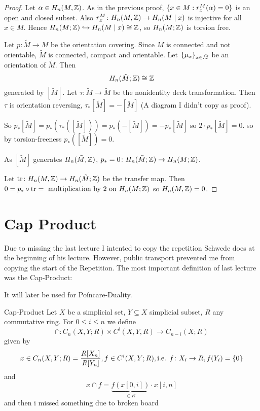 \documentclass[language=english]{TemplateLecture}
\begin{document}
\begin{proof}
    Let \(\alpha \in H_n(M, \mathbb{Z})\). As in the previous proof,
    \(\{x \in M : r_x^M(\alpha) = 0\}\) is an open and closed subset. Also \(r_x^M\colon H_n(M, \mathbb{Z}) \to H_n(M \mid x)\) is injective for all \(x \in M\). Hence \(H_n(M; \mathbb{Z}) \hookrightarrow H_n(M \mid x) \cong \mathbb{Z}\), so \(H_n(M; \mathbb{Z})\) is torsion free.

    Let \(p\colon \tilde M \to M\) be the orientation covering. Since \(M\) is connected and not orientable, \(\tilde M\) is connected, compact and orientable. Let \(\{\mu_x\}_{x \in \tilde M}\) be an orientation of \(\tilde M\). Then
    \[H_n(\tilde M; \mathbb{Z}) \cong \mathbb{Z}\]
    generated by \([\tilde M]\). Let \(\tau\colon \tilde M \to \tilde M\) be the nonidentity deck transformation. Then \(\tau\) is orientation reversing, \(\tau_*[\tilde M] = - [\tilde M]\) (A diagram I didn't copy as proof).

    So \(p_*[\tilde M] = p_*(\tau_*([\tilde M])) = p_*(- [\tilde M]) = - p_* [\tilde M]\) so \(2 \cdot p_*[\tilde M] = 0\). so by torsion-freeness \(p_*([\tilde M]) = 0\).

    As \([\tilde M]\) generates \(H_n(\tilde M, \mathbb{Z})\), \(p_* = 0\colon H_n(\tilde M; \mathbb{Z}) \to H_n(M; \mathbb{Z})\).

    Let \(\mathrm{tr}\colon H_n(M, \mathbb{Z}) \to H_n(\tilde M; \mathbb{Z})\) be the transfer map. Then \(0 = p_* \circ \mathrm{tr} = \text{ multiplication by 2 on } H_n(M; \mathbb{Z}) \) so \(H_n(M, \mathbb{Z}) = 0\).
\end{proof}




\chapter{Cap Product}

Due to missing the last lecture I intented to copy the repetition Schwede does at the beginning of his lecture. However, public transport prevented me from copying the start of the Repetition. The most important definition of last lecture was the Cap-Product:

It will later be used for Poíncare-Duality.

\begin{defi}{Cap-Product}{}
    Let \(X\) be a simplicial set, \(Y \subseteq X\) simplicial subset, \(R\) any commutative ring. For \(0 \leq i \leq n\) we define
    \[\cap \colon C_n(X, Y ; R) \times C^{i}(X,Y, R) \to C_{n-i}(X;R)\]
    given by
    \[x \in C_n(X,Y;R) = \frac{R[X_n]}{R[Y_n]}, f \in C^{i}(X,Y;R), \text{i.e. } f \colon X_i \to R, f(Y_i) = \{0\}\]
    and
    \[x \cap f = \underbrace{f(x[0,i])}_{\in R} \cdot x[i, n]\]
    and then i missed something due to broken board
\end{defi}
\end{document}
